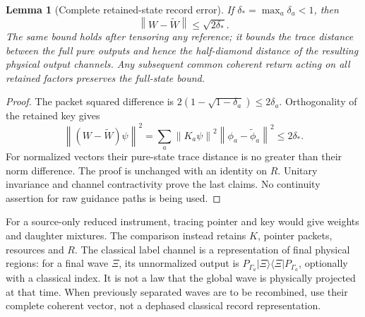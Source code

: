 \documentclass[11pt,oneside,openany]{book}
\newtheorem{lemma}[theorem]{Lemma}
\theoremstyle{definition}
\theoremstyle{remark}\newtheorem{remark}[theorem]{Remark}
\providecommand{\ket}[1]{\lvert#1\rangle}
\providecommand{\bra}[1]{\langle#1\rvert}
\providecommand{\norm}[1]{\left\lVert#1\right\rVert}
\begin{document}
\begin{lemma}[Complete retained-state record error]\label{mc:lem:instrument}
If $\delta_* =\max_a\delta_a<1$, then
\begin{equation}\label{mc:eq:isometryerror}
 \norm{W-\widetilde W}\le\sqrt{2\delta_*}.
\end{equation}
The same bound holds after tensoring any reference; it bounds the trace distance between the full pure outputs and hence the half-diamond distance of the resulting physical output channels. Any subsequent \emph{common} coherent return acting on all retained factors preserves the full-state bound.
\end{lemma}
\begin{proof}
The packet squared difference is $2(1-\sqrt{1-\delta_a})\le2\delta_a$. Orthogonality of the retained key gives
\[
 \norm{(W-\widetilde W)\psi}^2
 =\sum_a\norm{K_a\psi}^2\norm{\phi_a-\widetilde\phi_a}^2\le2\delta_*.
\]
For normalized vectors their pure-state trace distance is no greater than their norm difference. The proof is unchanged with an identity on $R$. Unitary invariance and channel contractivity prove the last claims. No continuity assertion for raw guidance paths is being used.
\end{proof}

For a source-only reduced instrument, tracing pointer and key would give weights and daughter mixtures. The comparison instead retains $K$, pointer packets, resources and $R$. The classical label channel is a representation of final physical regions: for a final wave $\Xi$, its unnormalized output is $P_{\Gamma_a}\ket\Xi\bra\Xi P_{\Gamma_a}$, optionally with a classical index. It is not a law that the global wave is physically projected at that time. When previously separated waves are to be recombined, use their complete coherent vector, not a dephased classical record representation.
\end{document}
